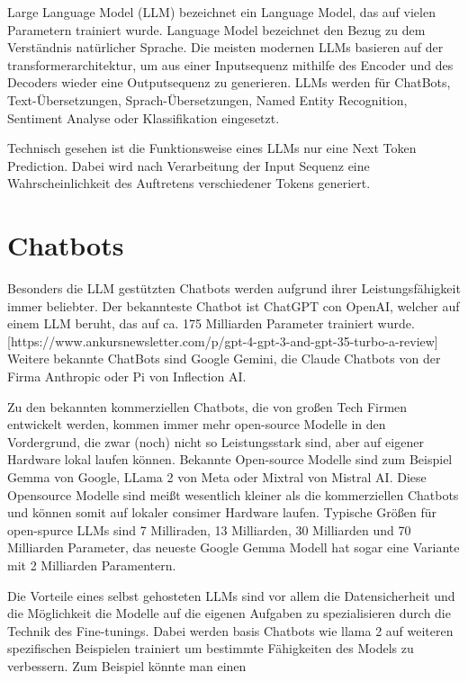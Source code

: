 Large Language Model (LLM) bezeichnet ein Language Model, das auf vielen Parametern trainiert wurde. 
Language Model bezeichnet den Bezug zu dem Verständnis natürlicher Sprache.
Die meisten modernen LLMs basieren auf der transformerarchitektur, um aus einer Inputsequenz mithilfe des Encoder und des Decoders wieder eine Outputsequenz zu generieren.
LLMs werden für ChatBots, Text-Übersetzungen, Sprach-Übersetzungen, Named Entity Recognition, Sentiment Analyse oder Klassifikation eingesetzt.

Technisch gesehen ist die Funktionsweise eines LLMs nur eine Next Token Prediction.
Dabei wird nach Verarbeitung der Input Sequenz eine Wahrscheinlichkeit des Auftretens verschiedener Tokens generiert.



\section{Chatbots}




Besonders die LLM gestützten Chatbots werden aufgrund ihrer Leistungsfähigkeit immer beliebter.
Der bekannteste Chatbot ist ChatGPT con OpenAI, welcher auf einem LLM beruht, das auf ca. 175 Milliarden Parameter trainiert wurde. [https://www.ankursnewsletter.com/p/gpt-4-gpt-3-and-gpt-35-turbo-a-review]
Weitere bekannte ChatBots sind Google Gemini, die Claude Chatbots von der Firma Anthropic oder Pi von Inflection AI.

Zu den bekannten kommerziellen Chatbots, die von großen Tech Firmen entwickelt werden, kommen immer mehr open-source Modelle in den Vordergrund, die zwar (noch) nicht so Leistungsstark sind, aber auf eigener Hardware lokal laufen können.
Bekannte Open-source Modelle sind zum Beispiel Gemma von Google, LLama 2 von Meta oder Mixtral von Mistral AI.
Diese Opensource Modelle sind meißt wesentlich kleiner als die kommerziellen Chatbots und können somit auf lokaler consimer Hardware laufen.
Typische Größen für open-spurce LLMs sind 7 Milliraden, 13 Milliarden, 30 Milliarden und 70 Milliarden Parameter, das neueste Google Gemma Modell hat sogar eine Variante mit 2 Milliarden Paramentern.


Die Vorteile eines selbst gehosteten LLMs sind vor allem die Datensicherheit und die Möglichkeit die Modelle auf die eigenen Aufgaben zu spezialisieren durch die Technik des Fine-tunings.
Dabei werden basis Chatbots wie llama 2 auf weiteren spezifischen Beispielen trainiert um bestimmte Fähigkeiten des Models zu verbessern.
Zum Beispiel könnte man einen 






